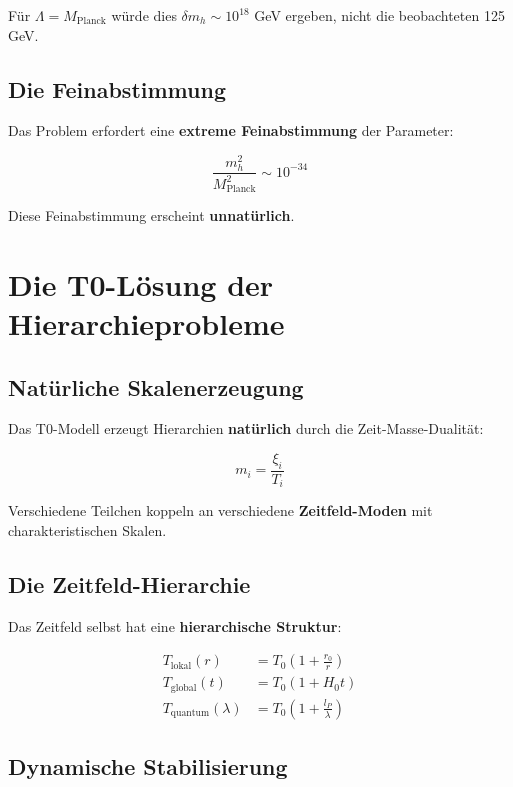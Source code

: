 \documentclass[12pt,a4paper]{report}
\begin{document}
	Für $\Lambda = M_{\text{Planck}}$ würde dies $\delta m_h \sim 10^{18}$ GeV ergeben, nicht die beobachteten 125 GeV.
	
	\subsection{Die Feinabstimmung}
	
	Das Problem erfordert eine \textbf{extreme Feinabstimmung} der Parameter:
	
	\begin{equation}
		\frac{m_h^2}{M_{\text{Planck}}^2} \sim 10^{-34}
	\end{equation}
	
	Diese Feinabstimmung erscheint \textbf{unnatürlich}.
	
	\section{Die T0-Lösung der Hierarchieprobleme}
	
	\subsection{Natürliche Skalenerzeugung}
	
	Das T0-Modell erzeugt Hierarchien \textbf{natürlich} durch die Zeit-Masse-Dualität:
	
	\begin{equation}
		m_i = \frac{\xi_i}{T_i}
	\end{equation}
	
	Verschiedene Teilchen koppeln an verschiedene \textbf{Zeitfeld-Moden} mit charakteristischen Skalen.
	
	\subsection{Die Zeitfeld-Hierarchie}
	
	Das Zeitfeld selbst hat eine \textbf{hierarchische Struktur}:
	
	\begin{align}
		T_{\text{lokal}}(r) &= T_0\left(1 + \frac{r_0}{r}\right) \\
		T_{\text{global}}(t) &= T_0(1 + H_0 t) \\
		T_{\text{quantum}}(\lambda) &= T_0\left(1 + \frac{l_P}{\lambda}\right)
	\end{align}
	
	\subsection{Dynamische Stabilisierung}
	
\end{document}

